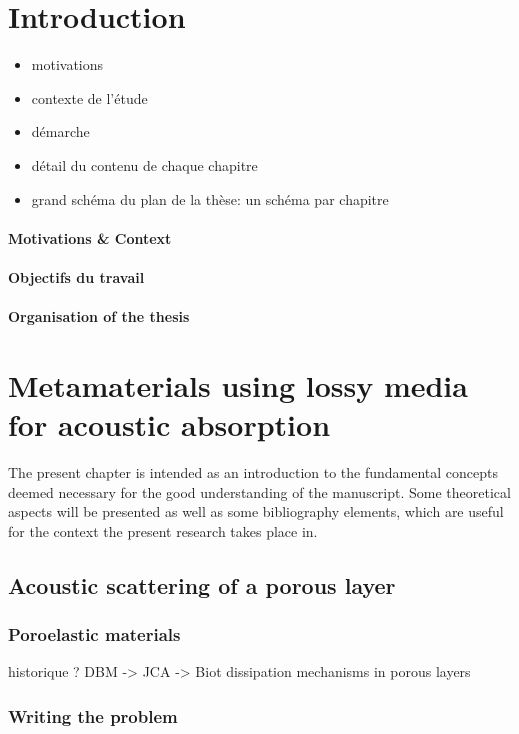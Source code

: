 \chapter*{Introduction}
\begin{itemize}
    \item motivations
    \item contexte de l'étude
    \item démarche
    \item détail du contenu de chaque chapitre
    \item grand schéma du plan de la thèse: un schéma par chapitre
\end{itemize}
\subsubsection{Motivations \& Context}
\subsubsection{Objectifs du travail}
\subsubsection{Organisation of the thesis}
 

\chapter{Metamaterials using lossy media for acoustic absorption}
The present chapter is intended as an introduction to the fundamental concepts deemed necessary for the good understanding of the manuscript. Some theoretical aspects will be presented as well as some bibliography elements, which are useful for the context the present research takes place in. 

\section{Acoustic scattering of a porous layer}
\subsection{Poroelastic materials}
historique ? DBM -> JCA -> Biot
dissipation mechanisms in porous layers
\subsection{Writing the problem}
